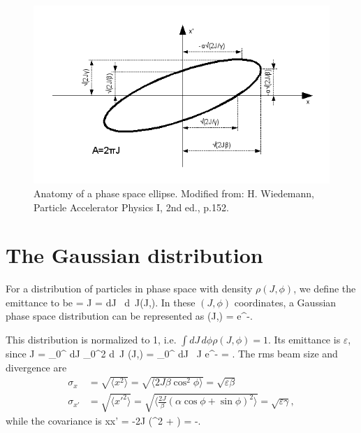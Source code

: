 \begin{figure}[htp]
	\centering \includegraphics[scale=0.75]{phaseellipse.png}
	\caption{Anatomy of a phase space ellipse.  Modified from: H. Wiedemann, Particle Accelerator Physics I, 2nd ed., p.152.}
	\label{fig:ellipse}
\end{figure}

\section{The Gaussian distribution}
For a distribution of particles in phase space with density $\rho(J,\phi)$, we define the emittance to be
\Begineq
	\varepsilon = \langle J \rangle = \int dJ \, d\phi \, J\rho(J,\phi).
\Endeq
In these $(J,\phi)$ coordinates, a Gaussian phase space distribution can be represented as
\Begineq
	\rho(J,\phi) =  e^{-}.
	\label{eq:rho}
\Endeq

This distribution is normalized to 1, i.e. $\int dJ \, d\phi \rho(J,\phi) = 1$.  Its emittance is $\varepsilon$, since
\Begineq
	\langle J \rangle = \int_{0}^{\infty} dJ \int_{0}^{2\pi} d\phi \, J \rho(J,\phi) =  \int_{0}^{\infty} dJ \, J e^{-} = \varepsilon.
\Endeq
The rms beam size and divergence are
\begin{align}
	\sigma_x & = \sqrt{\langle x^2 \rangle} = \sqrt{\langle 2J\beta \cos^2 \phi \rangle} = \sqrt{\varepsilon\beta}  \\
	\sigma_{x'} & = \sqrt{\langle x'^2 \rangle} = \sqrt{\biggl\langle \frac{2J}{\beta} (\alpha \cos\phi + \sin\phi)^2 \biggr\rangle} = \sqrt{\varepsilon\gamma},
	\label{eq:rms}
\end{align}
while the covariance is
\Begineq
	\langle xx' \rangle = \langle -2J (\alpha \cos^2 \phi + \sin\phi \cos\phi) \rangle = -\varepsilon\alpha.
	\label{eq:corr}
\Endeq

